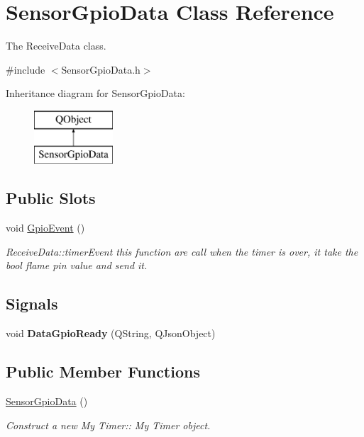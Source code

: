 \hypertarget{classSensorGpioData}{}\section{Sensor\+Gpio\+Data Class Reference}
\label{classSensorGpioData}


The Receive\+Data class.  




{\ttfamily \#include $<$Sensor\+Gpio\+Data.\+h$>$}

Inheritance diagram for Sensor\+Gpio\+Data\+:\begin{figure}[H]
\begin{center}
\leavevmode
\includegraphics[height=2.000000cm]{classSensorGpioData}
\end{center}
\end{figure}
\subsection*{Public Slots}
\begin{DoxyCompactItemize}
\item 
\mbox{\label{classSensorGpioData_a9978184c1074157ea029bcc4c305a937}} 
void \hyperlink{classSensorGpioData_a9978184c1074157ea029bcc4c305a937}{Gpio\+Event} ()
\begin{DoxyCompactList}\small\item\em Receive\+Data\+::timer\+Event this function are call when the timer is over, it take the bool flame pin value and send it. \end{DoxyCompactList}\end{DoxyCompactItemize}
\subsection*{Signals}
\begin{DoxyCompactItemize}
\item 
\mbox{\label{classSensorGpioData_a627b8ceb7dff21b4e6ea4451191e109e}} 
void {\bfseries Data\+Gpio\+Ready} (Q\+String, Q\+Json\+Object)
\end{DoxyCompactItemize}
\subsection*{Public Member Functions}
\begin{DoxyCompactItemize}
\item 
\hyperlink{classSensorGpioData_a040047c46fd1f8f3f50aa17ed93c9360}{Sensor\+Gpio\+Data} ()
\begin{DoxyCompactList}\small\item\em Construct a new My Timer\+:\+: My Timer object. \end{DoxyCompactList}\end{DoxyCompactItemize}


